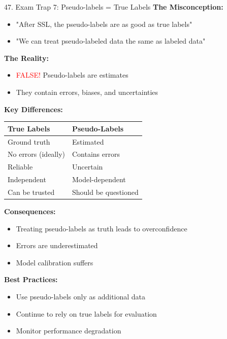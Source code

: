 \documentclass[8pt]{beamer}
\begin{document}
	\begin{frame}{47. Exam Trap 7: Pseudo-labels = True Labels}
		\fontsize{6.5}{7.5}\selectfont
		\textbf{The Misconception:}
		\begin{itemize}
			\item "After SSL, the pseudo-labels are as good as true labels"
			\item "We can treat pseudo-labeled data the same as labeled data"
		\end{itemize}
		
		\textbf{The Reality:}
		\begin{itemize}
			\item \textcolor{red}{FALSE!} Pseudo-labels are estimates
			\item They contain errors, biases, and uncertainties
		\end{itemize}
		
		\textbf{Key Differences:}
		
		\begin{tabular}{|p{3.5cm}|p{3.5cm}|}
			\hline
			\textbf{True Labels} & \textbf{Pseudo-Labels} \\
			\hline
			Ground truth & Estimated \\
			\hline
			No errors (ideally) & Contains errors \\
			\hline
			Reliable & Uncertain \\
			\hline
			Independent & Model-dependent \\
			\hline
			Can be trusted & Should be questioned \\
			\hline
		\end{tabular}
		
		\textbf{Consequences:}
		\begin{itemize}
			\item Treating pseudo-labels as truth leads to overconfidence
			\item Errors are underestimated
			\item Model calibration suffers
		\end{itemize}
		
		\textbf{Best Practices:}
		\begin{itemize}
			\item Use pseudo-labels only as additional data
			\item Continue to rely on true labels for evaluation
			\item Monitor performance degradation
		\end{itemize}
	\end{frame}
	
\end{document}
